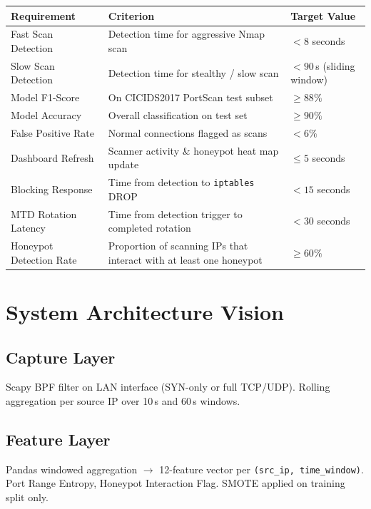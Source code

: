 \documentclass[12pt,a4paper]{article}
\begin{document}
\begin{table}[h!]
\centering
\small
\begin{tabular}{L{4cm} L{6.5cm} C{3.5cm}}
  \toprule
  \textbf{Requirement} & \textbf{Criterion} & \textbf{Target Value} \\
  \midrule
  Fast Scan Detection      & Detection time for aggressive Nmap scan         & $< 8$ seconds \\
  Slow Scan Detection      & Detection time for stealthy / slow scan         & $< 90$\,s (sliding window) \\
  Model F1-Score           & On CICIDS2017 PortScan test subset              & $\geq 88\%$ \\
  Model Accuracy           & Overall classification on test set              & $\geq 90\%$ \\
  False Positive Rate      & Normal connections flagged as scans             & $< 6\%$ \\
  Dashboard Refresh        & Scanner activity \& honeypot heat map update    & $\leq 5$ seconds \\
  Blocking Response        & Time from detection to \texttt{iptables} DROP   & $< 15$ seconds \\
  MTD Rotation Latency     & Time from detection trigger to completed rotation & $< 30$ seconds \\
  Honeypot Detection Rate  & Proportion of scanning IPs that interact with
                             at least one honeypot                           & $\geq 60\%$ \\
  \bottomrule
\end{tabular}
\end{table}


\section{System Architecture Vision}

\subsection{Capture Layer}
Scapy BPF filter on LAN interface (SYN-only or full TCP/UDP).
Rolling aggregation per source IP over 10\,s and 60\,s windows.

\subsection{Feature Layer}
Pandas windowed aggregation $\rightarrow$ 12-feature vector per
\texttt{(src\_ip, time\_window)}. Port Range Entropy, Honeypot Interaction
Flag. SMOTE applied on training split only.
\end{document}

